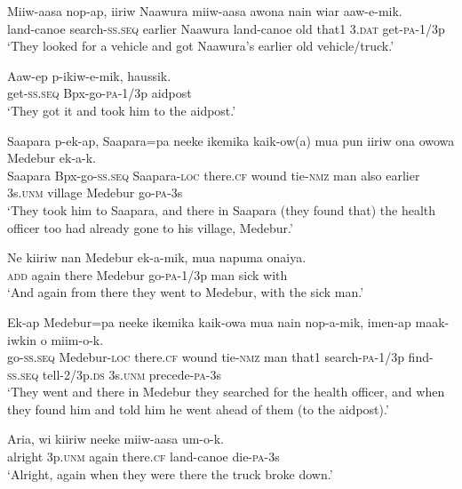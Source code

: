\ea
\gll  Miiw-aasa  nop-ap,  iiriw  Naawura  miiw-aasa  awona  nain     wiar  aaw-e-mik. \\
land-canoe  search-\textsc{ss.seq}  earlier  Naawura  land-canoe  old  that1  3.\textsc{dat}  get-\textsc{pa}-1/3p \\


\glt ‘They looked for a vehicle and got Naawura’s earlier old vehicle/truck.’ \\
\z


\ea
\gll  Aaw-ep  p-ikiw-e-mik,  haussik. \\
get-\textsc{ss.seq}  Bpx-go-\textsc{pa}-1/3p  aidpost \\
\glt ‘They got it and took him to the aidpost.’ \\
\z


\ea
\gll  Saapara  p-ek-ap,  Saapara=pa  neeke  ikemika  kaik-ow(a) mua  pun  iiriw  ona  owowa  Medebur  ek-a-k. \\
Saapara  Bpx-go-\textsc{ss.seq}  Saapara-\textsc{loc}  there.\textsc{cf}  wound  tie-\textsc{nmz}   man  also  earlier  3s.\textsc{unm}  village  Medebur  go-\textsc{pa}-3s \\


\glt ‘They took him to Saapara, and there in Saapara (they found that) the health officer too had already gone to his village, Medebur.’ \\
\z


\ea
\gll  Ne  kiiriw  nan  Medebur  ek-a-mik,  mua  napuma  onaiya. \\
\textsc{add}  again  there  Medebur  go-\textsc{pa}-1/3p  man  sick  with \\
\glt ‘And again from there they went to Medebur, with the sick man.’ \\
\z


\ea
\gll  Ek-ap  Medebur=pa  neeke  ikemika  kaik-owa  mua  nain  nop-a-mik,  imen-ap  maak-iwkin  o  miim-o-k. \\
go-\textsc{ss.seq}  Medebur-\textsc{loc}  there.\textsc{cf}  wound  tie-\textsc{nmz}  man  that1  search-\textsc{pa}-1/3p  find-\textsc{ss.seq}  tell-2/3p.\textsc{ds}  3s.\textsc{unm}  precede-\textsc{pa}-3s \\


\glt ‘They went and there in Medebur they searched for the health officer, and when they found him and told him he went ahead of them (to the aidpost).’ \\
\z


\ea
\gll  Aria,  wi  kiiriw  neeke  miiw-aasa  um-o-k. \\
alright  3p.\textsc{unm}  again  there.\textsc{cf}  land-canoe  die-\textsc{pa}-3s \\
\glt ‘Alright, again when they were there the truck broke down.’ \\
\z


